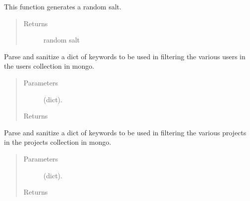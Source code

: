 \documentclass[letterpaper,10pt,english]{sphinxmanual}
\begin{document}
\begin{fulllineitems}
\label{\detokenize{apidoc/utdesign_procurement:utdesign_procurement.utils.generateSalt}}
This function generates a random salt.
\begin{quote}\begin{description}
\item[{Returns}] \leavevmode
random salt

\end{description}\end{quote}

\end{fulllineitems}


\begin{fulllineitems}
\label{\detokenize{apidoc/utdesign_procurement:utdesign_procurement.utils.getKeywords}}
Parse and sanitize a dict of keywords to be used in filtering the
various users in the users collection in mongo.
\begin{quote}\begin{description}
\item[{Parameters}] \leavevmode
{} \textendash{} (dict).

\item[{Returns}] \leavevmode


\end{description}\end{quote}

\end{fulllineitems}


\begin{fulllineitems}
\label{\detokenize{apidoc/utdesign_procurement:utdesign_procurement.utils.getProjectKeywords}}
Parse and sanitize a dict of keywords to be used in filtering the
various projects in the projects collection in mongo.
\begin{quote}\begin{description}
\item[{Parameters}] \leavevmode
{} \textendash{} (dict).

\item[{Returns}] \leavevmode


\end{description}\end{quote}

\end{fulllineitems}
\end{document}
